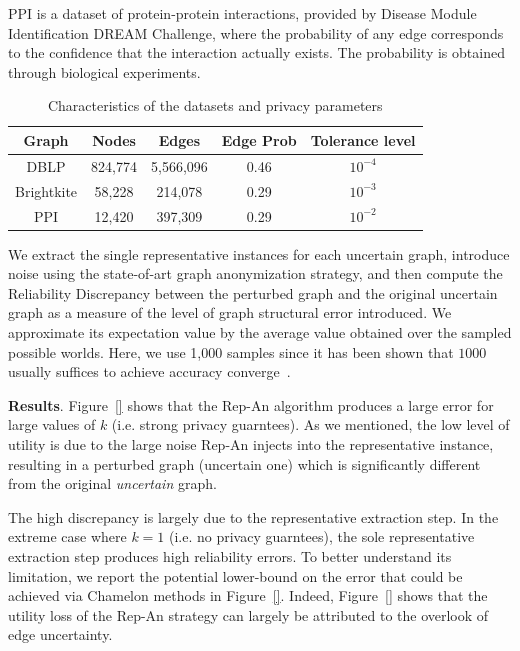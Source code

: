 \textsc{PPI} is a dataset of protein-protein interactions, provided by Disease Module Identification DREAM Challenge, where the probability of any edge corresponds to the confidence that the interaction actually exists.
The probability is obtained through biological experiments.

\begin{table}[t]
    \centering
        \caption{Characteristics of the datasets and privacy parameters}
        \begin{tabular}{|c|c|c|c||c|}
        \hline 
        Graph    & Nodes    & Edges    &Edge Prob    & Tolerance level\\
        \hline  
        DBLP     &824,774   &5,566,096 & 0.46        & $10^{-4}$\\
        \small{Brightkite} &58,228   & 214,078 &0.29 &$10^{-3}$ \\
        PPI      &12,420   & 397,309  & 0.29         &$10^{-2}$\\
        \hline
        \end{tabular}
        \label{tab:dataset}
\end{table}

We extract the single representative instances for each uncertain graph, introduce noise using the state-of-art graph anonymization strategy, and then compute the Reliability Discrepancy between the perturbed graph and the original uncertain graph as a measure of the level of graph structural error introduced. We approximate its expectation value by the average value obtained over the sampled possible worlds. Here, we use 1,000 samples since it has been shown that $1000$ usually suffices to achieve accuracy converge~\cite{Potamias_K_2010}.

\textbf{Results}. Figure~\ref{} shows that the Rep-An algorithm produces a large error for large values of $k$ (i.e. strong privacy guarntees). As we mentioned, the low level of utility is due to the large noise Rep-An injects into the representative instance, resulting in a perturbed graph (uncertain one) which is significantly different from the original \emph{uncertain} graph. 

The high discrepancy is largely due to the representative extraction step. In the extreme case where $k=1$ (i.e. no privacy guarntees), the sole representative extraction step produces high reliability errors. 
To better understand its limitation, we report the potential lower-bound on the error that could be achieved via Chamelon methods in Figure~\ref{}. Indeed, Figure~\ref{} shows that the utility loss of the Rep-An strategy can largely be attributed to the overlook of edge uncertainty.   




